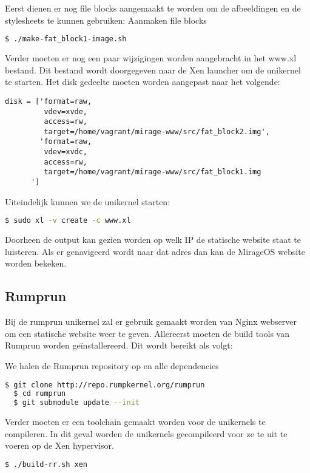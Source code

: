 Eerst dienen er nog file blocks aangemaakt te worden om de afbeeldingen en de stylesheets te kunnen gebruiken:
\noindent Aanmaken file blocks
\begin{lstlisting}[language=bash]
  $ ./make-fat_block1-image.sh
\end{lstlisting}

Verder moeten er nog een paar wijzigingen worden aangebracht in het www.xl bestand. Dit bestand wordt doorgegeven naar de Xen launcher om de unikernel te starten.
\noindent Het disk gedeelte moeten worden aangepast naar het volgende:
\begin{lstlisting}
disk = ['format=raw,
         vdev=xvde,
         access=rw,
         target=/home/vagrant/mirage-www/src/fat_block2.img',
        'format=raw,
         vdev=xvdc,
         access=rw,
         target=/home/vagrant/mirage-www/src/fat_block1.img
      ']
\end{lstlisting}


\noindent Uiteindelijk kunnen we de unikernel starten:
\begin{lstlisting}[language=bash]
  $ sudo xl -v create -c www.xl
\end{lstlisting}

Doorheen de output kan gezien worden op welk IP de statische website staat te luisteren. Als er genavigeerd wordt naar dat adres dan kan de MirageOS website worden bekeken.

\subsection{Rumprun}

Bij de rumprun unikernel zal er gebruik gemaakt worden van Nginx webserver om een statische website weer te geven. 
Allereerst moeten de build tools van Rumprun worden geïnstallereerd.
Dit wordt bereikt als volgt:

\noindent We halen de Rumprun repository op en alle dependencies
\begin{lstlisting}[language=bash]
  $ git clone http://repo.rumpkernel.org/rumprun
  $ cd rumprun
  $ git submodule update --init
\end{lstlisting}

Verder moeten er een toolchain gemaakt worden voor de unikernels te compileren. In dit geval worden de unikernels gecompileerd voor ze te uit te voeren op de Xen hypervisor.
\begin{lstlisting}[language=bash]
  $ ./build-rr.sh xen
\end{lstlisting}

